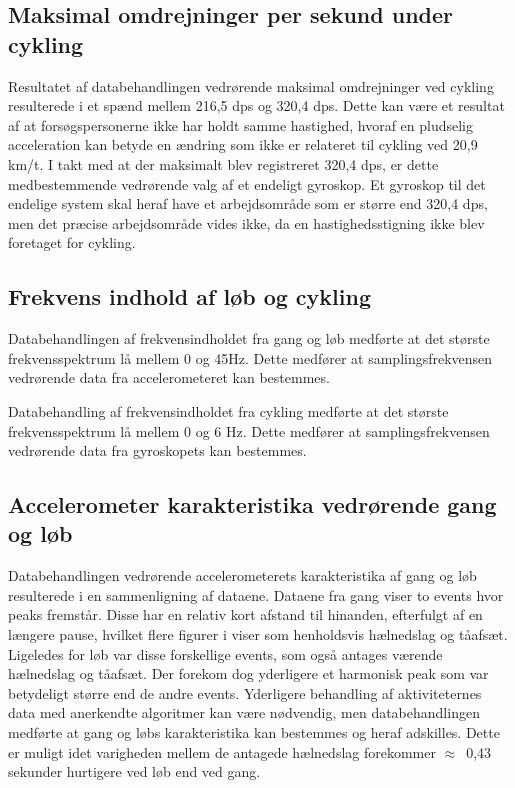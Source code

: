 \subsection{Maksimal omdrejninger per sekund under cykling}
Resultatet af databehandlingen vedrørende maksimal omdrejninger ved cykling resulterede i et spænd mellem 216,5 dps og 320,4 dps. Dette kan være et resultat af at forsøgspersonerne ikke har holdt samme hastighed, hvoraf en pludselig acceleration kan betyde en ændring som ikke er relateret til cykling ved 20,9 km/t. I takt med at der maksimalt blev registreret 320,4 dps, er dette medbestemmende vedrørende valg af et endeligt gyroskop. Et gyroskop til det endelige system skal heraf have et arbejdsområde som er større end 320,4 dps, men det præcise arbejdsområde vides ikke, da en hastighedsstigning ikke blev foretaget for cykling.

\subsection{Frekvens indhold af løb og cykling}
Databehandlingen af frekvensindholdet fra gang og løb medførte at det største frekvensspektrum lå mellem 0 og 45Hz. Dette medfører at samplingsfrekvensen vedrørende data fra accelerometeret kan bestemmes. 

Databehandling af frekvensindholdet fra cykling medførte at det største frekvensspektrum lå mellem 0 og 6 Hz. Dette medfører at samplingsfrekvensen vedrørende data fra gyroskopets kan bestemmes. 

\subsection{Accelerometer karakteristika vedrørende gang og løb}
Databehandlingen vedrørende accelerometerets karakteristika af gang og løb resulterede i en sammenligning af dataene. Dataene fra gang viser to events hvor peaks fremstår. Disse har en relativ kort afstand til hinanden, efterfulgt af en længere pause, hvilket flere figurer i  viser som henholdsvis hælnedslag og tåafsæt. Ligeledes for løb var disse forskellige events, som også antages værende hælnedslag og tåafsæt. Der forekom dog yderligere et harmonisk peak som var betydeligt større end de andre events. Yderligere behandling af aktiviteternes data med anerkendte algoritmer kan være nødvendig, men databehandlingen medførte at gang og løbs karakteristika kan bestemmes og heraf adskilles. Dette er muligt idet varigheden mellem de antagede hælnedslag forekommer $\approx$~0,43 sekunder hurtigere ved løb end ved gang.

